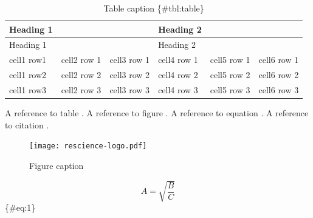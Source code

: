 \documentclass[10pt,a4paper,onecolumn]{article}
\begin{document}
\begin{longtable}[]{@{}llllll@{}}
\caption{Table caption \{\#tbl:table\}}\tabularnewline
\toprule
\begin{minipage}[b]{0.16\columnwidth}\raggedright\strut
Heading 1\strut
\end{minipage} & \begin{minipage}[b]{0.16\columnwidth}\raggedright\strut
\strut
\end{minipage} & \begin{minipage}[b]{0.16\columnwidth}\raggedright\strut
\strut
\end{minipage} & \begin{minipage}[b]{0.16\columnwidth}\raggedright\strut
Heading 2\strut
\end{minipage} & \begin{minipage}[b]{0.16\columnwidth}\raggedright\strut
\strut
\end{minipage} & \begin{minipage}[b]{0.16\columnwidth}\raggedright\strut
\strut
\end{minipage}\tabularnewline
\midrule
\endfirsthead
\toprule
\begin{minipage}[b]{0.16\columnwidth}\raggedright\strut
Heading 1\strut
\end{minipage} & \begin{minipage}[b]{0.16\columnwidth}\raggedright\strut
\strut
\end{minipage} & \begin{minipage}[b]{0.16\columnwidth}\raggedright\strut
\strut
\end{minipage} & \begin{minipage}[b]{0.16\columnwidth}\raggedright\strut
Heading 2\strut
\end{minipage} & \begin{minipage}[b]{0.16\columnwidth}\raggedright\strut
\strut
\end{minipage} & \begin{minipage}[b]{0.16\columnwidth}\raggedright\strut
\strut
\end{minipage}\tabularnewline
\midrule
\endhead
cell1 row1 & cell2 row 1 & cell3 row 1 & cell4 row 1 & cell5 row 1 &
cell6 row 1\tabularnewline
cell1 row2 & cell2 row 2 & cell3 row 2 & cell4 row 2 & cell5 row 2 &
cell6 row 2\tabularnewline
cell1 row3 & cell2 row 3 & cell3 row 3 & cell4 row 3 & cell5 row 3 &
cell6 row 3\tabularnewline
\bottomrule
\end{longtable}

A reference to table \textcite{tbl:table}. A reference to figure
\textcite{fig:logo}. A reference to equation \textcite{eq:1}. A
reference to citation \textcite{markdown}.

\begin{figure}
\centering
\texttt{[image: rescience-logo.pdf]}
\caption{Figure caption}\label{fig:logo}
\end{figure}

\[ A = \sqrt{\frac{B}{C}} \] \{\#eq:1\}

{\sffamily \small
  \printbibliography[title=References]
}
\end{document}
